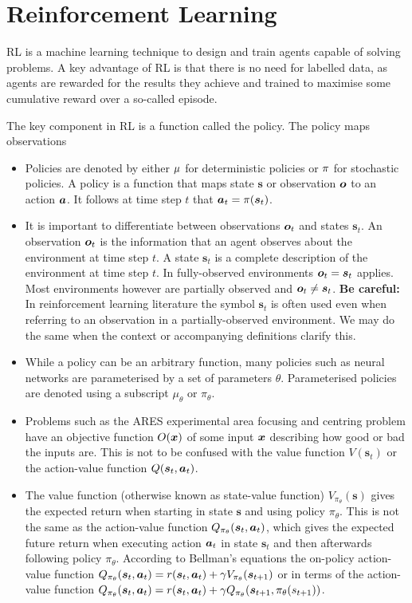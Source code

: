 \section{Reinforcement Learning}

\Acf{RL} is a machine learning technique to design and train agents capable of solving problems. A key advantage of \ac{RL} is that there is no need for labelled data, as agents are rewarded for the results they achieve and trained to maximise some cumulative reward over a so-called episode.

The key component in \ac{RL} is a function called the policy. The policy maps observations

\begin{itemize}
    \item Policies are denoted by either $\mu$ for deterministic policies or $\pi$ for stochastic policies. A policy is a function that maps state $\bm{s}$ or observation $\bm{o}$ to an action $\bm{a}$. It follows at time step $t$ that $\bm{a}_t = \pi(\bm{s}_t)$.
    \item It is important to differentiate between observations $\bm{o}_t$ and states $\bm{s}_t$. An observation $\bm{o}_t$ is the information that an agent observes about the environment at time step $t$. A state $\bm{s}_t$ is a complete description of the environment at time step $t$. In fully-observed environments $\bm{o}_t = \bm{s}_t$ applies. Most environments however are partially observed and $\bm{o}_t \neq \bm{s}_t$. \textbf{Be careful:} In reinforcement learning literature the symbol $\bm{s}_t$ is often used even when referring to an observation in a partially-observed environment. We may do the same when the context or accompanying definitions clarify this.
    \item While a policy can be an arbitrary function, many policies such as neural networks are parameterised by a set of parameters $\theta$. Parameterised policies are denoted using a subscript $\mu_\theta$ or $\pi_\theta$.
    \item Problems such as the ARES experimental area focusing and centring problem have an objective function $O(\bm{x})$ of some input $\bm{x}$ describing how good or bad the inputs are. This is not to be confused with the value function $V(\bm{s}_t)$ or the action-value function $Q(\bm{s}_t, \bm{a}_t)$.
    \item The value function (otherwise known as state-value function) $V_{\pi_\theta}(\bm{s})$ gives the expected return when starting in state $\bm{s}$ and using policy $\pi_\theta$. This is not the same as the action-value function $Q_{\pi_\theta}(\bm{s}_t, \bm{a}_t)$, which gives the expected future return when executing action $\bm{a}_t$ in state $\bm{s}_t$ and then afterwards following policy $\pi_\theta$. According to Bellman's equations the on-policy action-value function $Q_{\pi_\theta}(\bm{s}_t, \bm{a}_t) = r(\bm{s}_t, \bm{a}_t) + \gamma V_{\pi_\theta}(\bm{s}_{t+1})$ or in terms of the action-value function $Q_{\pi_\theta}(\bm{s}_t, \bm{a}_t) = r(\bm{s}_t, \bm{a}_t) + \gamma Q_{\pi_\theta}(\bm{s}_{t+1}, \pi_\theta(s_{t+1}))$.

\end{itemize}
